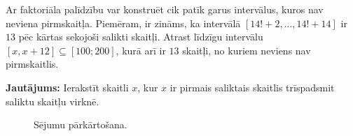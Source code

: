 \documentclass[a4paper,12pt]{article}
\newcommand\answer[1]{}
\begin{document}
\vspace{20pt}
\begin{problem}
Ar faktoriāla palīdzību var konstruēt cik patīk garus intervālus, kuros nav neviena pirmskaitļa.
Piemēram, ir zināms, ka intervālā $[14!+2,\ldots,14!+14]$ ir $13$ pēc kārtas sekojoši salikti skaitļi.
Atrast līdzīgu intervālu $[x,x+12] \subseteq [100;200]$, kurā arī ir $13$ skaitļi, no kuriem neviens nav pirmskaitlis.

{\bf Jautājums:} Ierakstīt skaitli $x$, kur $x$ ir pirmais saliktais skaitlis trīspadsmit saliktu skaitļu virknē.
\answer{

{\bf Atbilde:} $\mathtt{114}$\\
Ar tiešām pārbaudēm varam pārliecināties, ka visi trīspadsmit skaitļi intervālā $[114;126]$ ir salikti.

{\em Piezīme.} Atstarpes starp pirmskaitļiem minētas šajā tabulā: \cite{UTMprimeGaps}.
}
\end{problem}






\vspace{20pt}
\begin{figure}[!htb]
\caption{\label{fig:robot-and-books} Sējumu pārkārtošana.}
\end{figure}
\end{document}
